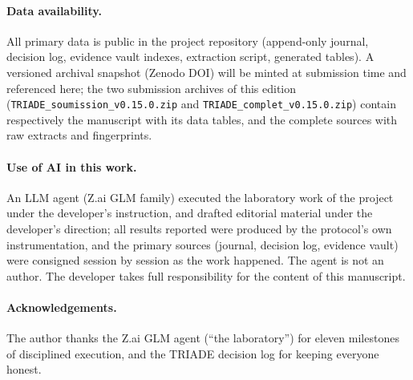 \documentclass[11pt,a4paper]{article}
\newcommand{\code}[1]{\texttt{\small #1}}
\begin{document}
\paragraph{Data availability.} All primary data is public in the project
repository (append-only journal, decision log, evidence vault indexes,
extraction script, generated tables). A versioned archival snapshot
(Zenodo DOI) will be minted at submission time and referenced here; the
two submission archives of this edition (\code{TRIADE\_soumission\_v0.15.0.zip}
and \code{TRIADE\_complet\_v0.15.0.zip}) contain respectively the
manuscript with its data tables, and the complete sources with raw
extracts and fingerprints.

\paragraph{Use of AI in this work.} An LLM agent (Z.ai GLM family)
executed the laboratory work of the project under the developer's
instruction, and drafted editorial material under the developer's
direction; all results reported were produced by the protocol's own
instrumentation, and the primary sources (journal, decision log,
evidence vault) were consigned session by session as the work happened.
The agent is not an author. The developer takes full responsibility for
the content of this manuscript.

\paragraph{Acknowledgements.} The author thanks the Z.ai GLM agent
(``the laboratory'') for eleven milestones of disciplined execution, and
the TRIADE decision log for keeping everyone honest.


\end{document}
